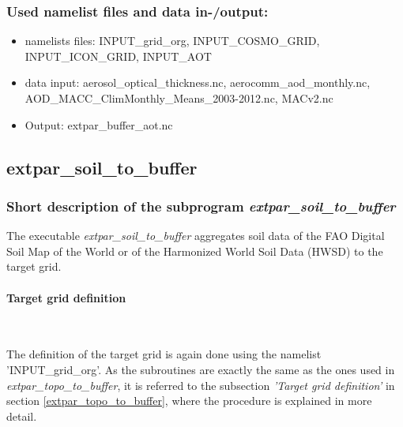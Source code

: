 \documentclass[a4paper,10pt,DIV14,BCOR1cm,titlepage,twoside]{scrartcl}
\begin{document}
\subsubsection{Used namelist files and data in-/output:}
\begin{itemize}
\item namelists files: INPUT\_grid\_org, INPUT\_COSMO\_GRID, INPUT\_ICON\_GRID, INPUT\_AOT
 \item data input: aerosol\_optical\_thickness.nc, aerocomm\_aod\_monthly.nc, \\ AOD\_MACC\_ClimMonthly\_Means\_2003-2012.nc, MACv2.nc
 \item Output: extpar\_buffer\_aot.nc
\end{itemize}



\subsection{extpar\_soil\_to\_buffer}\label{extpar_soil_to_buffer}
\subsubsection{Short description of the subprogram \textit{extpar\_soil\_to\_buffer}}
The executable \textit{extpar\_soil\_to\_buffer} aggregates soil data of the FAO Digital Soil Map of the World or of the Harmonized World Soil Data (HWSD) to the target grid.\par\medskip\noindent
\paragraph{Target grid definition} \ \par\medskip\noindent
The definition of the target grid is again done using the namelist 'INPUT\_grid\_org'. As the subroutines are exactly the same as the ones used in \textit{extpar\_topo\_to\_buffer}, it is referred to the subsection \textit{'Target grid definition'} in section \ref{extpar_topo_to_buffer}, where the procedure is explained in more detail. \par\medskip\noindent
\end{document}

